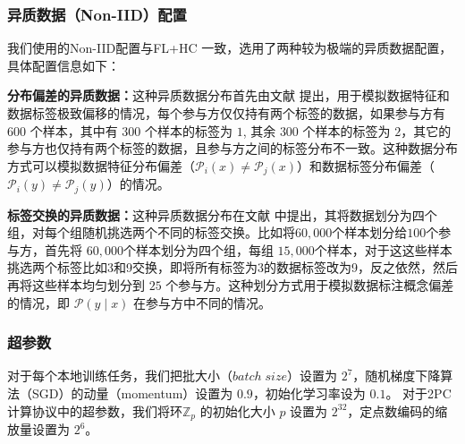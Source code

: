 \subsubsection{异质数据（Non-IID）配置}
我们使用的Non-IID配置与FL+HC \cite{briggs2020federated} 一致，选用了两种较为极端的异质数据配置，具体配置信息如下：
\begin{compactenum}
	\item \textbf{分布偏差的异质数据：}这种异质数据分布首先由文献 \cite{mcmahan2017communication} 提出，用于模拟数据特征和数据标签极致偏移的情况，每个参与方仅仅持有两个标签的数据，如果参与方有$600$ 个样本，其中有 $300$ 个样本的标签为 $1$, 其余 $300$ 个样本的标签为 $2$，其它的参与方也仅持有两个标签的数据，且参与方之间的标签分布不一致。这种数据分布方式可以模拟数据特征分布偏差（$\mathcal{P}_i(x) \neq \mathcal{P}_j(x)$）和数据标签分布偏差（$\mathcal{P}_i(y) \neq \mathcal{P}_j(y)$）的情况。
	\item \textbf{标签交换的异质数据：}这种异质数据分布在文献 \cite{sattler2020clustered} 中提出，其将数据划分为四个组，对每个组随机挑选两个不同的标签交换。比如将$60,000$个样本划分给$100$个参与方，首先将 $60,000$个样本划分为四个组，每组 $15,000$个样本，对于这这些样本挑选两个标签比如3和9交换，即将所有标签为3的数据标签改为9，反之依然，然后再将这些样本均匀划分到 $25$ 个参与方。这种划分方式用于模拟数据标注概念偏差的情况，即 $\mathcal{P}(y \mid x)$ 在参与方中不同的情况。
\end{compactenum}

\subsubsection{超参数}
对于每个本地训练任务，我们把批大小（$batch\;size$）设置为 $2^7$，随机梯度下降算法（SGD）的动量（momentum）设置为 $0.9$，初始化学习率设为 $0.1$。
对于2PC计算协议中的超参数，我们将环$\mathbb{Z}_p$ 的初始化大小 $p$ 设置为 $2^{32}$，定点数编码的缩放量设置为 $2^6$。

